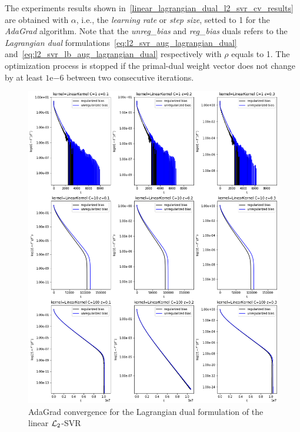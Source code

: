 The experiments results shown in~\ref{linear_lagrangian_dual_l2_svr_cv_results} are obtained with $\alpha$, i.e., the \emph{learning rate} or \emph{step size}, setted to 1 for the \emph{AdaGrad} algorithm. Note that the \emph{unreg\_bias} and \emph{reg\_bias} duals refers to the \emph{Lagrangian dual} formulations~\eqref{eq:l2_svr_aug_lagrangian_dual} and~\eqref{eq:l2_svr_lb_aug_lagrangian_dual} respectively with $\rho$ equals to 1. The optimization process is stopped if the primal-dual weight vector does not change by at least $1\mathrm{e}{-6}$  between two consecutive iterations.



\begin{figure}[H]
	\centering
	\includegraphics[scale=0.55]{img/linear_lagrangian_dual_l2_svr_loss_history}
	\caption{AdaGrad convergence for the Lagrangian dual formulation of the linear $\protect \mathcal{L}_2$-SVR}
	\label{fig:linear_lagrangian_dual_l2_svr_loss_history}
\end{figure}

